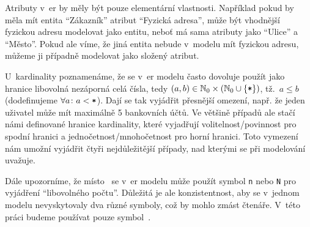 Atributy v~\acrshort{er} by měly být pouze elementární vlastnosti.
Například pokud by měla mít entita \enquote{Zákazník} atribut \enquote{Fyzická adresa}, může být vhodnější fyzickou adresu modelovat jako entitu, neboť má sama atributy jako \enquote{Ulice} a \enquote{Město}.
Pokud ale víme, že jiná entita nebude v~modelu mít fyzickou adresu, můžeme ji případně modelovat jako složený atribut.

U~kardinality poznamenáme, že se v~\acrshort{er} modelu často dovoluje použít jako hranice libovolná nezáporná celá čísla, tedy $(a, b)\in \mathbb N_0\times \left(\mathbb N_0 \cup \left\{\texttt{*}\right\}\right)$, tž.~$a\leq b$ (dodefinujeme $\forall a\colon a < \texttt{*}$).
Dají se tak vyjádřit přesnější omezení, např. že jeden uživatel může mít maximálně 5 bankovních účtů.
Ve většině případů ale stačí námi definované hranice kardinality, které vyjadřují volitelnost/povinnost pro spodní hranici a jednočetnost/mnohočetnost pro horní hranici.
Toto vymezení nám umožní vyjádřit čtyři nejdůležitější případy, nad kterými se při modelování uvažuje.

Dále upozorníme, že místo~\many{} se v~\acrshort{er} modelu může použít symbol \texttt{n} nebo \texttt{N} pro vyjádření \enquote{libovolného počtu}.
Důležitá je ale konzistentnost, aby se v~jednom modelu nevyskytovaly dva různé symboly, což by mohlo zmást čtenáře.
V~této práci budeme používat pouze symbol~\many{}.

